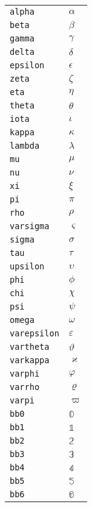 \begin{longtable}{ll}
\texttt{alpha}&${}\alpha {}$\\
\texttt{beta}&${}\beta {}$\\
\texttt{gamma}&${}\gamma {}$\\
\texttt{delta}&${}\delta {}$\\
\texttt{epsilon}&${}\epsilon {}$\\
\texttt{zeta}&${}\zeta {}$\\
\texttt{eta}&${}\eta {}$\\
\texttt{theta}&${}\theta {}$\\
\texttt{iota}&${}\iota {}$\\
\texttt{kappa}&${}\kappa {}$\\
\texttt{lambda}&${}\lambda {}$\\
\texttt{mu}&${}\mu {}$\\
\texttt{nu}&${}\nu {}$\\
\texttt{xi}&${}\xi {}$\\
\texttt{pi}&${}\pi {}$\\
\texttt{rho}&${}\rho {}$\\
\texttt{varsigma}&${}\varsigma {}$\\
\texttt{sigma}&${}\sigma {}$\\
\texttt{tau}&${}\tau {}$\\
\texttt{upsilon}&${}\upsilon {}$\\
\texttt{phi}&${}\phi {}$\\
\texttt{chi}&${}\chi {}$\\
\texttt{psi}&${}\psi {}$\\
\texttt{omega}&${}\omega {}$\\
\texttt{varepsilon}&${}\varepsilon {}$\\
\texttt{vartheta}&${}\vartheta {}$\\
\texttt{varkappa}&${}\varkappa {}$\\
\texttt{varphi}&${}\varphi {}$\\
\texttt{varrho}&${}\varrho {}$\\
\texttt{varpi}&${}\varpi {}$\\
\texttt{bb0}&${}\mathbb{0}{}$\\
\texttt{bb1}&${}\mathbb{1}{}$\\
\texttt{bb2}&${}\mathbb{2}{}$\\
\texttt{bb3}&${}\mathbb{3}{}$\\
\texttt{bb4}&${}\mathbb{4}{}$\\
\texttt{bb5}&${}\mathbb{5}{}$\\
\texttt{bb6}&${}\mathbb{6}{}$\\

\end{longtable}
